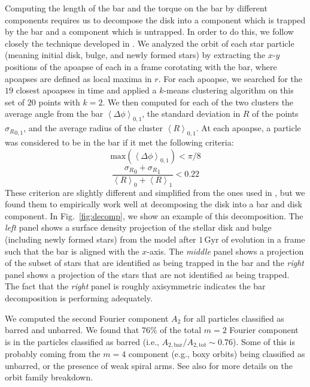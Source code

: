 \begin{appendices}
Computing the length of the bar and the torque on the bar by different
components requires us to decompose the disk into a component which is trapped
by the bar and a component which is untrapped. In order to do this, we follow
closely the technique developed in \citet{2016MNRAS.463.1952P}. We analyzed the
orbit of each star particle (meaning initial disk, bulge, and newly formed
stars) by extracting the $x$-$y$ positions of the apoapse of each in a frame
corotating with the bar, where apoapses are defined as local maxima in $r$. For
each apoapse, we searched for the $19$ closest apoapses in time and applied a
$k$-means clustering algorithm on this set of $20$ points with $k=2$. We then
computed for each of the two clusters the average angle from the bar
$\left<\Delta \phi\right>_{0,1}$, the standard deviation in $R$ of the points
${\sigma_R}_{0,1}$, and the average radius of the cluster
$\left<R\right>_{0,1}$. At each apoapse, a particle was considered to be in the
bar if it met the following criteria:
\begin{equation}
\textrm{max}\left(\left<\Delta \phi\right>_{0,1}\right) < \pi / 8
\end{equation}
\begin{equation}
\frac{{\sigma_R}_0 + {\sigma_R}_1}{\left<R\right>_0 + \left<R\right>_1} < 0.22
\end{equation}
These criterion are slightly different and simplified from the ones used in
\citet{2016MNRAS.463.1952P}, but we found them to empirically work well at
decomposing the disk into a bar and disk component. In Fig.~\ref{fig:decomp}, we
show an example of this decomposition. The \textit{left} panel shows a surface
density projection of the stellar disk and bulge (including newly formed stars)
from the \SMUGGLE{} model after $1\,\text{Gyr}$ of evolution in a frame such that
the bar is aligned with the $x$-axis. The \textit{middle} panel shows a
projection of the subset of stars that are identified as being trapped in the
bar and the \textit{right} panel shows a projection of the stars that are not
identified as being trapped. The fact that the \textit{right} panel is roughly
axisymmetric indicates the bar decomposition is performing adequately.

We computed the second Fourier component $A_2$ for all particles classified as
barred and unbarred. We found that $76\%$ of the total $m=2$ Fourier component
is in the particles classified as barred (i.e.,
$A_{2,\textrm{bar}}/A_{2,\textrm{tot}}\sim0.76$). Some of this is probably
coming from the $m=4$ component (e.g., boxy orbits) being classified as
unbarred, or the presence of weak spiral arms. See also
\citet{2021MNRAS.500..838P} for more details on the orbit family breakdown.


\end{appendices}
